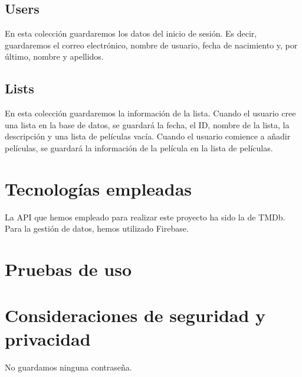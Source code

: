 \documentclass{article}
\begin{document}
\subsection{Users}
En esta colección guardaremos los datos del inicio de sesión. Es decir, guardaremos el correo electrónico, nombre de usuario, fecha de nacimiento y, por último, nombre y apellidos.

\subsection{Lists}
En esta colección guardaremos la información de la lista. Cuando el usuario cree una lista en la base de datos, se guardará la fecha, el ID, nombre de la lista, la descripción y una lista de películas vacía. Cuando el usuario comience a añadir películas, se guardará la información de la película en la lista de películas.

\section{Tecnologías empleadas}
La API que hemos empleado para realizar este proyecto ha sido la de TMDb. Para la gestión de datos, hemos utilizado Firebase.

\section{Pruebas de uso}

\section{Consideraciones de seguridad y privacidad}
No guardamos ninguna contraseña.
\end{document}
